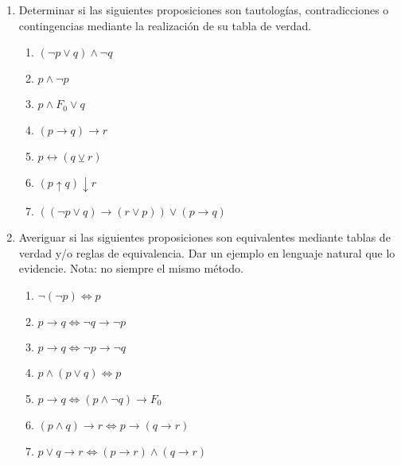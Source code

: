 \documentclass[a4paper]{article}
\newcommand{\exercise}{\item}
\newcommand{\then}{\to}
\newcommand{\eq}{\leftrightarrow}
\newcommand{\xor}{\veebar}
\newcommand{\nor}{\downarrow}
\newcommand{\nand}{\uparrow}
\newcommand{\Eq}{\Leftrightarrow}
\begin{document}
\begin{enumerate}
\begin{multicols}{2}
\begin{enumerate} [label=(\alph*)]
		\item Una de dos: o mañana lloverá o estará soleado. 
		\item La materia se aprueba promocionando los parciales, aprobando el final o dando exitosamente el exámen libre. 
		\item El pan no levará si le ponés mucha sal. Tampoco levará si lo dejás en un lugar frío. 
		\item Si te tomás el 324 te deja cerca de la UNQ, si te tomás el 65 no. 
	\end{enumerate}
	\end{multicols}
	\exercise Determinar si las siguientes proposiciones son tautologías, contradicciones o contingencias mediante la realización de su tabla de verdad. 
	\begin{multicols}{2}
	\begin{enumerate} [label=(\alph*)]
		\item $(\neg p \lor  q) \land  \neg q$
		\item $p \land  \neg p$
		\item $p \land  F_0 \lor  q$
		\item $(p \then  q) \then  r$
		\item $p \eq (q \xor  r)$
		\item $(p \nand q) \nor r$
		\item $((\neg p \lor q) \then (r \lor p)) \lor (p \then q)$
	\end{enumerate}
	\end{multicols}
	\exercise Averiguar si las siguientes proposiciones son equivalentes mediante tablas de verdad y/o reglas de equivalencia.  Dar un ejemplo en lenguaje natural que lo evidencie. Nota: no siempre el mismo método.
	\begin{multicols}{2}
	\begin{enumerate} [label=(\alph*)]
		\item $\neg (\neg p) \Eq  p$
		\item $p\then q \Eq \neg q\then \neg p$
		\item $p\then q \Eq \neg p\then \neg q$
		\item $p \land  (p \lor  q) \Eq  p$
		\item $p\then q	\Eq (p \land  \neg q)\then F_0$
		\item $(p\land q)\then r \Eq p\then (q\then r) $
		\item $p\lor q \then  r	\Eq (p\then r) \land  (q\then r)$
	\end{enumerate}
	\end{multicols}

\end{enumerate}
\end{document}
